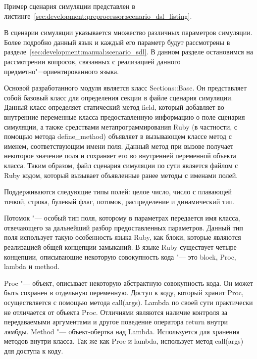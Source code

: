 Пример сценария симуляции представлен в листинге~\ref{sec:development:preprocessor:scenario_dsl_listing}.



В сценарии симуляции указывается множество различных параметров симуляции.
Более подробно данный язык и каждый его параметр будут рассмотрены в разделе~\ref{sec:development:manual:scenario_sdl}.
В данном разделе остановимся на рассмотрении вопросов, связанных с реализацией данного предметно"=ориентированного языка.

Основой разработанного модуля является класс Sections::Base. Он представляет собой базовый класс для определения секции в файле сценария симуляции.
Данный класс определяет статический метод field, который добавляет во внутренние переменные класса предоставленную информацию о поле сценария симуляции,
а также средствами метапрограммирования Ruby (в частности, с помощью метода define\_method) объявляет в вызывающем классе метод с именем, соответствующим имени поля.
Данный метод при вызове получает некоторое значение поля и сохраняет его во внутренней переменной объекта класса.
Таким образом, файл сценария симуляции по сути является файлом с Ruby кодом, который вызывает объявленные ранее методы с именами полей.

Поддерживаются следующие типы полей: целое число, число с плавающей точкой, строка, булевый флаг, потомок, распределение и динамический тип.

Потомок "--- особый тип поля, которому в параметрах передается имя класса, отвечающего за дальнейший разбор предоставленных параметров.
Данный тип поля использует такую особенность языка Ruby, как блоки, которые являются реализацией общей концепции замыканий.
В языке Ruby существует четыре концепции, описывающие некоторую совокупность кода "--- это block, Proc, lambda и method.

Proc "--- объект, описывает некоторую абстрактную совокупность кода. Он может быть сохранен в отдельную переменную. Доступ к коду, который хранит Proc, осуществляется с помощью метода call(args).
Lambda по своей сути практически не отличается от объекта Proc. Отличиями являются наличие контроля за передаваемыми аргументами и другое поведение оператора return внутри лямбды.
Method "--- объект-обертка над Lambda. Используется для хранения методов внутри класса. Так же как Proc и lambda, использует метод call(args) для доступа к коду.

